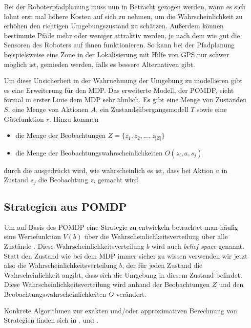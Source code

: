\documentclass[a4paper]{IEEEtran}
\begin{document}
Bei der Roboterpfadplanung muss nun in Betracht gezogen werden, wann es sich lohnt erst mal höhere Kosten auf sich zu nehmen, um die Wahrscheinlichkeit zu erhöhen den richtigen Umgebungszustand zu schätzen. Außerdem können bestimmte Pfade mehr oder weniger attraktiv werden, je nach dem wie gut die Sensoren des Roboters auf ihnen funktionieren. So kann bei der Pfadplanung beispielsweise eine Zone in der Lokalisierung mit Hilfe von GPS nur schwer möglich ist, gemieden werden, falls es bessere Alternativen gibt.

Um diese Unsicherheit in der Wahrnehmung der Umgebung zu modellieren gibt es eine Erweiterung für den MDP. Das erweiterte Modell, der POMDP, sieht formal in erster Linie dem MDP sehr ähnlich. Es gibt eine Menge von Zuständen $S$, eine Menge von Aktionen $A$, ein Zustandsübergangsmodell $T$ sowie eine Gütefunktion $r$. Hinzu kommen
\begin{itemize}
	\item die Menge der Beobachtungen $Z = \{z_1, z_2, ..., z_{|Z|}\}$
	\item die Menge der Beobachtungswahrscheinlichkeiten $O(z_i, a, s_j)$
\end{itemize}
durch die ausgedrückt wird, wie wahrscheinlich es ist, dass bei Aktion $a$ in Zustand $s_j$ die Beobachtung $z_i$ gemacht wird.

\subsection{Strategien aus POMDP}
Um auf Basis des POMDP eine Strategie zu entwickeln betrachtet man häufig eine Wertefunktion $V(b)$ über die Wahrscheinlichkeitsverteilung über alle Zustände \cite{roy2005finding}. Diese Wahrscheinlichkeitsverteilung $b$ wird auch \emph{belief space} genannt. Statt den Zustand wie bei dem MDP immer sicher zu wissen verwenden wir jetzt also die Wahrscheinlichkeitsverteilung $b$, der für jeden Zustand die Wahrscheinlichkeit angibt, dass sich die Umgebung in diesem Zustand befindet. Diese Wahrscheinlichkeitsverteilung wird anhand der Beobachtungen $Z$ und den Beobachtungswahrscheinlichkeiten $O$ verändert.

Konkrete Algorithmen zur exakten und/oder approximativen Berechnung von Strategien finden sich in \cite{cassandra1995acting}, \cite{roy2005finding} und \cite{thrun2005probabilistic}.



\end{document}
